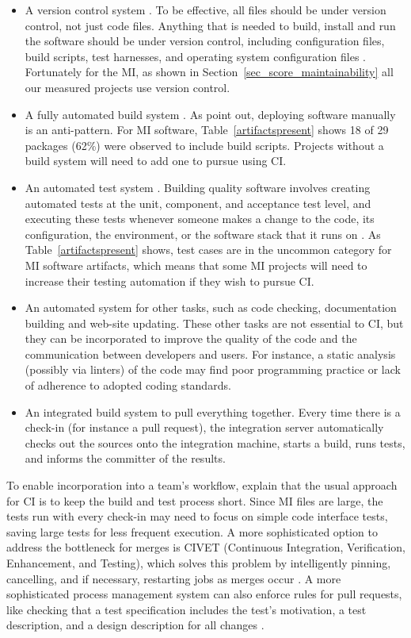 \documentclass[final, 12pt, 3p, times]{elsarticle}
\begin{document}
\begin{itemize}
	\item A version control system \cite{Fowler2006}. To be effective, all
	files should be under version control, not just code files.  Anything that
	is needed to build, install and run the software should be under version
	control, including configuration files, build scripts, test harnesses, and
	operating system configuration files \cite[p. 19]{HumbleAndFarley2010}.
	Fortunately for the MI, as shown in Section~\ref{sec_score_maintainability}
	all our measured projects use version control.
	\item A fully automated build system \cite{Fowler2006}.  As \cite[p.\
	5]{HumbleAndFarley2010} point out, deploying software manually is an
	anti-pattern.  For MI software, Table~\ref{artifactspresent} shows 18 of 29
	packages (62\%) were observed to include build scripts.  Projects without a
	build system will need to add one to pursue using CI.
	\item An automated test system \cite{Fowler2006}. Building quality software
	involves creating automated tests at the unit, component, and acceptance
	test level, and executing these tests whenever someone makes a change to the
	code, its configuration, the environment, or the software stack that it runs
	on \cite[p.\ 83]{HumbleAndFarley2010}. As Table~\ref{artifactspresent}
	shows, test cases are in the uncommon category for MI software artifacts,
	which means that some MI projects will need to increase their testing
	automation if they wish to pursue CI.
	\item An automated system for other tasks, such as code checking,
	documentation building and web-site updating.  These other tasks are not
	essential to CI, but they can be incorporated to improve the quality
	of the code and the communication between developers and users. For
	instance, a static analysis (possibly via linters) of the code may find poor
	programming practice or lack of adherence to adopted coding standards.
	\item An integrated build system to pull everything together.  Every time
	there is a check-in (for instance a pull request), the integration server
	automatically checks out the sources onto the integration machine, starts a
	build, runs tests, and informs the committer of the results. 
\end{itemize}

To enable incorporation into a team's workflow, \cite[p.\
60]{HumbleAndFarley2010} explain that the usual approach for CI is to keep the
build and test process short. Since MI files are large, the tests run with every
check-in may need to focus on simple code interface tests, saving large tests
for less frequent execution.  A more sophisticated option to address the
bottleneck for merges is CIVET (Continuous Integration, Verification,
Enhancement, and Testing), which solves this problem by intelligently pinning,
cancelling, and if necessary, restarting jobs as merges occur
\cite{SlaughterEtAl2021}. A more sophisticated process management system can
also enforce rules for pull requests, like checking that a test specification
includes the test's motivation, a test description, and a design description for
all changes \cite{SlaughterEtAl2021}. 
\end{document}
